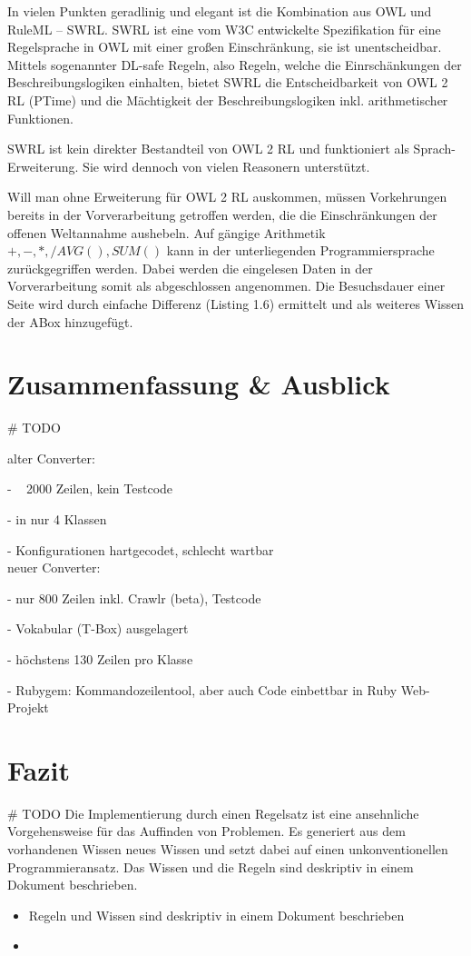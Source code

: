 \documentclass[runningheads,a4paper]{llncs}
\begin{document}
In vielen Punkten geradlinig und elegant ist die Kombination aus OWL und RuleML -- SWRL. 
SWRL ist eine vom W3C entwickelte Spezifikation für eine Regelsprache in OWL mit einer großen Einschränkung, sie ist unentscheidbar. 
Mittels sogenannter DL-safe Regeln, also Regeln, welche die Einrschänkungen der Beschreibungslogiken einhalten, bietet SWRL die Entscheidbarkeit von OWL 2 RL (PTime) und die Mächtigkeit der Beschreibungslogiken inkl. arithmetischer Funktionen. 

SWRL ist kein direkter Bestandteil von OWL 2 RL und funktioniert als Sprach-Erweiterung. 
Sie wird dennoch von vielen Reasonern unterstützt.

Will man ohne Erweiterung für OWL 2 RL auskommen, müssen Vorkehrungen bereits in der Vorverarbeitung getroffen werden, die die Einschränkungen der offenen Weltannahme aushebeln. 
Auf gängige Arithmetik \(+, -, *, / AVG(), SUM() \) kann in der unterliegenden Programmiersprache zurückgegriffen werden.
Dabei werden die eingelesen Daten in der Vorverarbeitung somit als abgeschlossen angenommen.
Die Besuchsdauer einer Seite wird durch einfache Differenz (Listing 1.6) ermittelt und als weiteres Wissen der ABox hinzugefügt.



\section{Zusammenfassung \& Ausblick}
\# TODO

alter Converter:

- ~ 2000 Zeilen, kein Testcode

- in nur 4 Klassen

- Konfigurationen hartgecodet, schlecht wartbar
\\
neuer Converter:

- nur 800 Zeilen inkl. Crawlr (beta), Testcode

- Vokabular (T-Box) ausgelagert

- höchstens 130 Zeilen pro Klasse

- Rubygem: Kommandozeilentool, aber auch Code einbettbar in Ruby Web-Projekt

\section{Fazit}
\# TODO
Die Implementierung durch einen Regelsatz ist eine ansehnliche Vorgehensweise für das Auffinden von Problemen. 
Es generiert aus dem vorhandenen Wissen neues Wissen und setzt dabei auf einen unkonventionellen Programmieransatz. 
Das Wissen und die Regeln sind deskriptiv in einem Dokument beschrieben. 



\begin{itemize}
    \item{Regeln und Wissen sind deskriptiv in einem Dokument beschrieben}
    \item{}    
\end{itemize}

\nocite{url_dl_primer}



\end{document}
